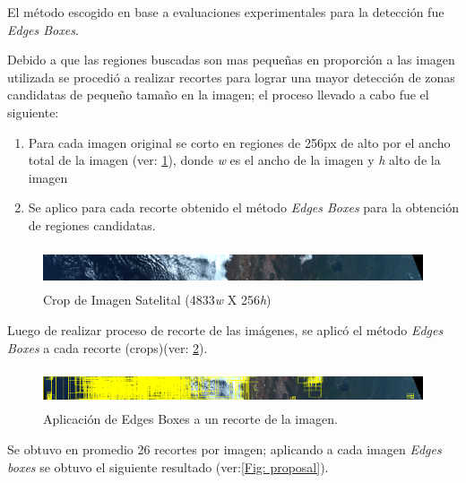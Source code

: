 El método escogido en base a evaluaciones experimentales para la detección fue \textit{Edges Boxes}. 

Debido a que las regiones buscadas son mas pequeñas en proporción a las imagen utilizada se procedió a realizar recortes para lograr una mayor detección de zonas candidatas de pequeño tamaño en la imagen; el proceso llevado a cabo fue el siguiente:

\begin{enumerate}
 \item Para cada imagen original se corto en regiones de 256px de alto por el ancho total de la imagen (ver: \ref{Fig: cropimagen}), donde \textit{w} es el ancho de la imagen y \textit{h} alto de la imagen
 \item Se aplico para cada recorte obtenido el método \textit{Edges Boxes} para la obtención de regiones candidatas.
\end{enumerate}

\begin{figure}[h]
 \centering
  \includegraphics[height=1.2cm,keepaspectratio=true,clip=true]{imagenes/Logos/cropimagen.png}
  \caption{Crop de Imagen Satelital (4833\textit{w} X 256\textit{h})}
	\label{Fig: cropimagen}
\end{figure}

Luego de realizar proceso de recorte de las imágenes, se aplicó el método \textit{Edges Boxes} a cada recorte (crops)(ver: \ref{Fig: cropproposal}).

\begin{figure}[h]
 \centering
  \includegraphics[height=1.1cm,keepaspectratio=true,clip=true]{imagenes/Logos/cropproposal.png}
  \caption{Aplicación de Edges Boxes a un recorte de la imagen.}
	\label{Fig: cropproposal}
\end{figure}

Se obtuvo en promedio 26 recortes por imagen; aplicando a cada imagen \textit{Edges boxes} se obtuvo el siguiente resultado (ver:\ref{Fig: proposal}).

